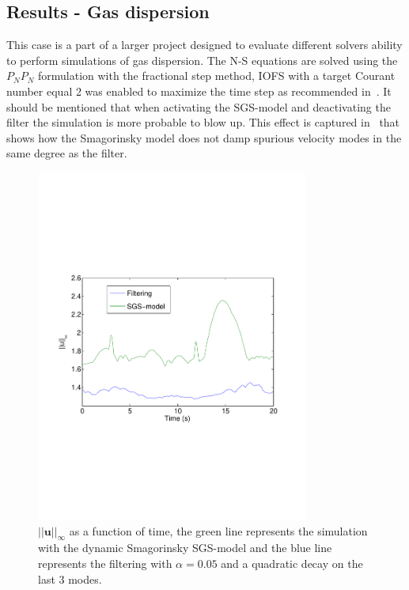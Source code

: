 \subsection{Results - Gas dispersion} 
This case is a part of a larger project designed to evaluate different solvers 
ability to perform simulations of gas dispersion. The N-S equations are solved using
the $P_NP_N$ formulation with the fractional step method, IOFS with a target Courant number 
equal 2 was enabled to maximize the time step as recommended in~\cite{Nek}. It should be 
mentioned that when activating the SGS-model and deactivating the 
filter the simulation is more probable to blow up. This effect is captured in~
that shows how the Smagorinsky model does not damp spurious velocity modes in the 
same degree as the filter. 

%
\begin{figure}[h]
	\centering
	\includegraphics[trim=0.5cm 7cm 0.5cm 7cm, width=0.8\textwidth]{Figures/maxvel.pdf}
    \caption{$||\mathbf{u}||_{\infty}$ as a function of time, the green line represents the 
simulation with the dynamic Smagorinsky SGS-model and the blue line represents the filtering 
with $\alpha = 0.05$ and a quadratic decay on the last 3 modes.}
	\label{fig:maxvel}
\end{figure}
%
%
%
%
%

